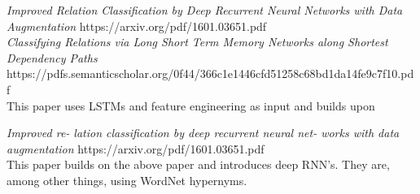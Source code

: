 \emph{Improved Relation Classification by Deep Recurrent Neural Networks
with Data Augmentation}
https://arxiv.org/pdf/1601.03651.pdf \\

\emph{Classifying Relations via Long Short Term Memory Networks
along Shortest Dependency Paths}
https://pdfs.semanticscholar.org/0f44/366c1e1446cfd51258c68bd1da14fe9c7f10.pdf \\

This paper uses LSTMs and feature engineering as input and builds upon 

\emph{Improved re- lation classification by deep recurrent neural net- works with data augmentation}
https://arxiv.org/pdf/1601.03651.pdf \\

This paper builds on the above paper and introduces deep RNN's. They are, among other things, using WordNet hypernyms.